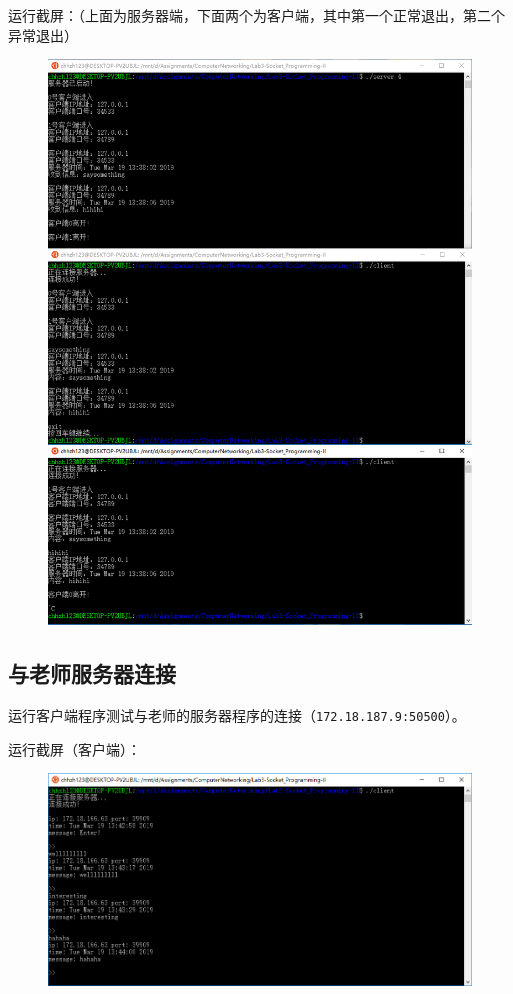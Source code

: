 \documentclass[logo,reportComp]{thesis}
\begin{document}
运行截屏：（上面为服务器端，下面两个为客户端，其中第一个正常退出，第二个异常退出）
\begin{figure}[H]
\centering
\includegraphics[width=\linewidth]{fig/p4.PNG}
\end{figure}

\subsection{与老师服务器连接}
运行客户端程序测试与老师的服务器程序的连接（\verb'172.18.187.9:50500'）。

运行截屏（客户端）：
\begin{figure}[H]
\centering
\includegraphics[width=\linewidth]{fig/p5.PNG}
\end{figure}
\end{document}
